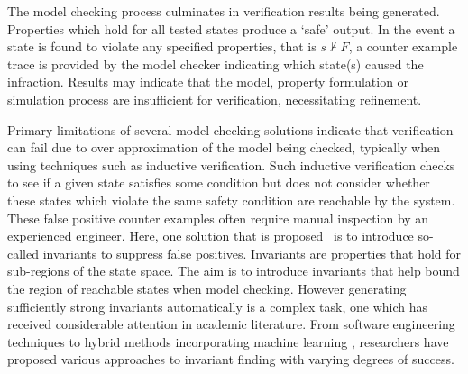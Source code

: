 \documentclass[conference,compsoc]{IEEEtran}
\begin{document}
The model checking process culminates in verification results being generated. Properties which hold for all tested states
produce a ‘safe’ output. In the event a state is found to violate any specified properties, that 
is $s \nvdash F$, a counter example trace is provided by the model checker indicating which state(s)
caused the infraction. Results may indicate that the model, property formulation or
simulation process are insufficient for verification, necessitating refinement.

Primary limitations of several model checking solutions indicate that verification can fail due to over approximation of the model being checked, typically when using techniques such as inductive verification. Such inductive verification checks to see if a given state satisfies
some condition but does not consider whether these states which violate
the same safety condition are reachable by the system. These false positive  counter examples often require manual inspection by an
experienced engineer. Here, one solution that is proposed~\cite{1688959} is to introduce so-called invariants to suppress false positives. Invariants are properties that hold for sub-regions of the state space. The aim is to introduce invariants that help bound the region of reachable states when model checking. However generating sufficiently strong invariants automatically is a complex task, one which has received considerable attention in academic
literature. From software engineering techniques \cite{case2007automated, bensalem1996powerful} to hybrid methods incorporating machine learning \cite{garg2016learning}, researchers have proposed various approaches to invariant finding with varying degrees of success.
\end{document}
